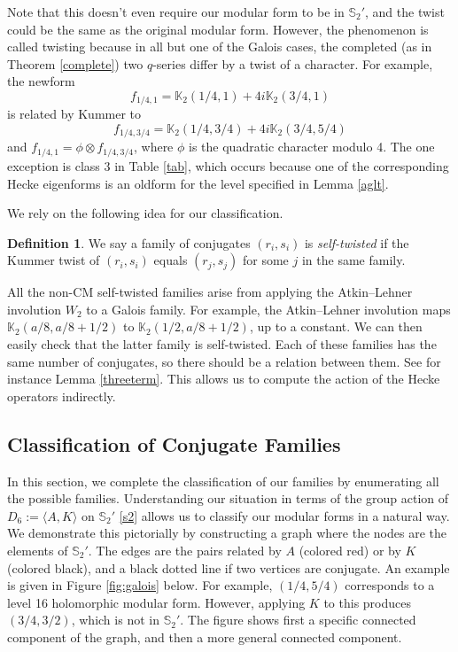\documentclass[12pt]{amsart}
\theoremstyle{definition}
\newtheorem{definition}[theorem]{Definition}
\theoremstyle{remark}
\begin{document}
Note that this doesn't even require our modular form to be in $\mathbb S_2'$, and
the twist could be the same as the original modular form. 
However, the phenomenon is called twisting because in all but one of the Galois cases, the completed (as in Theorem \ref{complete}) two $q$-series differ by a twist of a character. For example, the newform \begin{equation}\label{1/4}
f_{1/4,1}=\mathbb{K}_2(1/4,1)+4i\mathbb{K}_2(3/4,1)
\end{equation} is related by Kummer to $$f_{1/4,3/4}=\mathbb{K}_2(1/4,3/4)+4i \mathbb{K}_2(3/4,5/4)$$ and $f_{1/4,1}=\phi \otimes f_{1/4,3/4}$, where $\phi$ is the quadratic character modulo 4. The one exception is class 3 in Table \ref{tab}, which occurs because one of the corresponding Hecke eigenforms is an oldform for the level specified in Lemma \ref{aglt}.


We rely on the following idea for our classification.
\begin{definition}
    We say  a family of conjugates $(r_i,s_i)$ is \textit{self-twisted} if the Kummer twist of $(r_i,s_i)$ equals $(r_j,s_j)$ for some $j$ in the same family.
\end{definition}

 All the non-CM self-twisted families arise from applying the Atkin--Lehner involution $W_2$ to a Galois family. For example, the Atkin--Lehner involution maps $\mathbb{K}_2(a/8,a/8+1/2)$ to $\mathbb{K}_2(1/2,a/8+1/2)$, up to a constant. We can then easily check that the latter family is self-twisted. Each of these families has the same number of conjugates, so there should be a relation between them. See for instance Lemma \ref{threeterm}. This allows us to compute the action of the Hecke operators indirectly.

 




\subsection{Classification of Conjugate Families}\label{class} In this section, we complete the classification of our families by enumerating all the possible families. Understanding our situation in terms of the group action of $D_6:=\langle A,K\rangle$ on $\mathbb{S}_2'$ \eqref{s2} allows us to classify our modular forms in a natural way. We demonstrate this pictorially by constructing a graph where the nodes are the elements of $\mathbb{S}_2'$. The edges are the pairs related by $A$ (colored red) or by $K$ (colored black), and a black dotted line if two vertices are conjugate.  An example is given in Figure \ref{fig:galois} below. 
 For example, $(1/4,5/4)$ corresponds to a level 16 holomorphic modular form. However, applying $K$ to this produces $(3/4,3/2)$, which is not in $\mathbb{S}_2'$. The figure shows first a specific connected component of the graph, and then a more general connected component.
\end{document}

